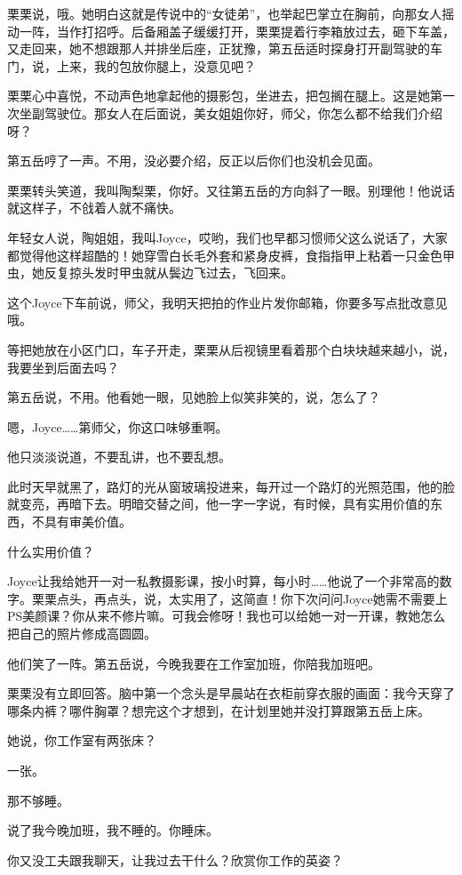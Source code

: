 \documentclass[lang=cn,newtx,12pt,scheme=chinese]{elegantbook}
\begin{document}
栗栗说，哦。她明白这就是传说中的“女徒弟”，也举起巴掌立在胸前，向那女人摇动一阵，当作打招呼。后备厢盖子缓缓打开，栗栗提着行李箱放过去，砸下车盖，又走回来，她不想跟那人并排坐后座，正犹豫，第五岳适时探身打开副驾驶的车门，说，上来，我的包放你腿上，没意见吧？

栗栗心中喜悦，不动声色地拿起他的摄影包，坐进去，把包搁在腿上。这是她第一次坐副驾驶位。那女人在后面说，美女姐姐你好，师父，你怎么都不给我们介绍呀？

第五岳哼了一声。不用，没必要介绍，反正以后你们也没机会见面。

栗栗转头笑道，我叫陶梨栗，你好。又往第五岳的方向斜了一眼。别理他！他说话就这样子，不戗着人就不痛快。

年轻女人说，陶姐姐，我叫Joyce，哎哟，我们也早都习惯师父这么说话了，大家都觉得他这样超酷的！她穿雪白长毛外套和紧身皮裤，食指指甲上粘着一只金色甲虫，她反复掠头发时甲虫就从鬓边飞过去，飞回来。

这个Joyce下车前说，师父，我明天把拍的作业片发你邮箱，你要多写点批改意见哦。

等把她放在小区门口，车子开走，栗栗从后视镜里看着那个白块块越来越小，说，我要坐到后面去吗？

第五岳说，不用。他看她一眼，见她脸上似笑非笑的，说，怎么了？

嗯，Joyce……第师父，你这口味够重啊。

他只淡淡说道，不要乱讲，也不要乱想。

此时天早就黑了，路灯的光从窗玻璃投进来，每开过一个路灯的光照范围，他的脸就变亮，再暗下去。明暗交替之间，他一字一字说，有时候，具有实用价值的东西，不具有审美价值。

什么实用价值？

Joyce让我给她开一对一私教摄影课，按小时算，每小时……他说了一个非常高的数字。栗栗点头，再点头，说，太实用了，这简直！你下次问问Joyce她需不需要上PS美颜课？你从来不修片嘛。可我会修呀！我也可以给她一对一开课，教她怎么把自己的照片修成高圆圆。

他们笑了一阵。第五岳说，今晚我要在工作室加班，你陪我加班吧。

栗栗没有立即回答。脑中第一个念头是早晨站在衣柜前穿衣服的画面：我今天穿了哪条内裤？哪件胸罩？想完这个才想到，在计划里她并没打算跟第五岳上床。

她说，你工作室有两张床？

一张。

那不够睡。

说了我今晚加班，我不睡的。你睡床。

你又没工夫跟我聊天，让我过去干什么？欣赏你工作的英姿？
\end{document}
